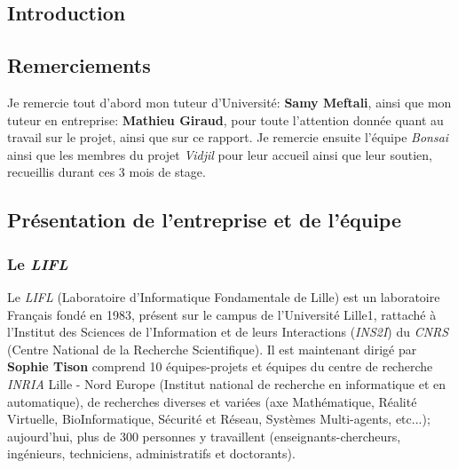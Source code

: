 \documentclass[pdftex,12pt,a4paper]{report}
\begin{document}
\begin{spacing}{1.2}



\tableofcontents

\chapter*{Introduction}


\section{Remerciements}
Je remercie tout d'abord mon tuteur d'Université: \textbf{Samy Meftali}, ainsi que mon tuteur en entreprise: \textbf{Mathieu Giraud}, pour toute l'attention donnée quant au travail sur le projet, ainsi que sur ce rapport.
\newline
Je remercie ensuite l'équipe \textit{Bonsai} ainsi que les membres du projet \textit{Vidjil} pour leur accueil ainsi que leur soutien, recueillis durant ces 3 mois de stage.

\section{Présentation de l'entreprise et de l'équipe}

\subsection{Le \textit{LIFL}}
Le \textit{LIFL} (Laboratoire d'Informatique Fondamentale de Lille) est un laboratoire Français fondé en 1983, présent sur le campus de l'Université Lille1, rattaché à l'Institut des Sciences de l'Information et de leurs Interactions (\textit{INS2I}) du \textit{CNRS} (Centre National de la Recherche Scientifique).
\newline
Il est maintenant dirigé par \textbf{Sophie Tison} comprend 10 équipes-projets et équipes du centre de recherche \textit{INRIA} Lille - Nord Europe (Institut national de recherche en informatique et en automatique), de recherches diverses et variées (axe Mathématique, Réalité Virtuelle, BioInformatique, Sécurité et Réseau, Systèmes Multi-agents, etc...); aujourd'hui, plus de 300 personnes y travaillent (enseignants-chercheurs, ingénieurs, techniciens, administratifs et doctorants).


\end{spacing}
\end{document}
